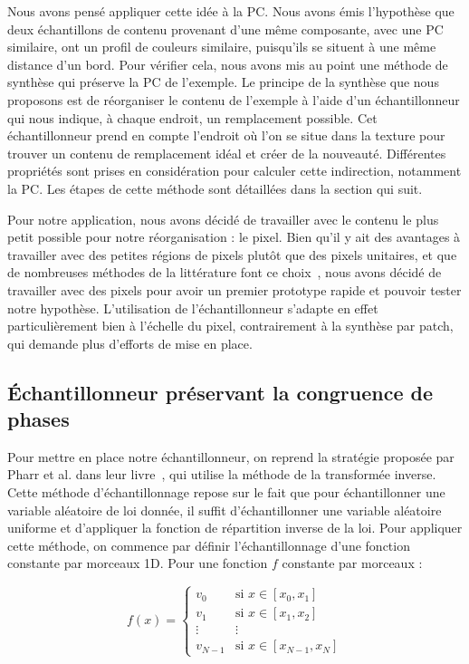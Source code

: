 \bigskip

Nous avons pensé appliquer cette idée à la PC. Nous avons émis l'hypothèse que deux échantillons de contenu provenant d'une même composante, avec une PC similaire, ont un profil de couleurs similaire, puisqu'ils se situent à une même distance d'un bord. Pour vérifier cela, nous avons mis au point une méthode de synthèse qui préserve la PC de l'exemple. Le principe de la synthèse que nous proposons est de réorganiser le contenu de l'exemple à l'aide d'un échantillonneur qui nous indique, à chaque endroit, un remplacement possible. Cet échantillonneur prend en compte l'endroit où l'on se situe dans la texture pour trouver un contenu de remplacement idéal et créer de la nouveauté. Différentes propriétés sont prises en considération pour calculer cette indirection, notamment la PC. Les étapes de cette méthode sont détaillées dans la section qui suit.

\bigskip

Pour notre application, nous avons décidé de travailler avec le contenu le plus petit possible pour notre réorganisation : le pixel. Bien qu'il y ait des avantages à travailler avec des petites régions de pixels plutôt que des pixels unitaires, et que de nombreuses méthodes de la littérature font ce choix~\cite{wei_state_2009}, nous avons décidé de travailler avec des pixels pour avoir un premier prototype rapide et pouvoir tester notre hypothèse. L'utilisation de l'échantillonneur s'adapte en effet particulièrement bien à l'échelle du pixel, contrairement à la synthèse par patch, qui demande plus d'efforts de mise en place.

\subsection{Échantillonneur préservant la congruence de phases}

Pour mettre en place notre échantillonneur, on reprend la stratégie proposée par Pharr et al. dans leur livre~\cite{pharr_physically_2023}, qui utilise la méthode de la transformée inverse. Cette méthode d'échantillonnage repose sur le fait que pour échantillonner une variable aléatoire de loi donnée, il suffit d'échantillonner une variable aléatoire uniforme et d'appliquer la fonction de répartition inverse de la loi. Pour appliquer cette méthode, on commence par définir l'échantillonnage d'une fonction constante par morceaux 1D. Pour une fonction $f$ constante par morceaux :


\begin{equation}
    f(x) = \left\{
        \begin{array}{ll}
            v_0 & \mbox{si } x \in [x_0, x_1] \\
            v_1 & \mbox{si } x \in [x_1, x_2] \\
            \vdots & \vdots \\
            v_{N-1} & \mbox{si } x \in [x_{N-1}, x_N]
        \end{array}
    \right.
\end{equation}


